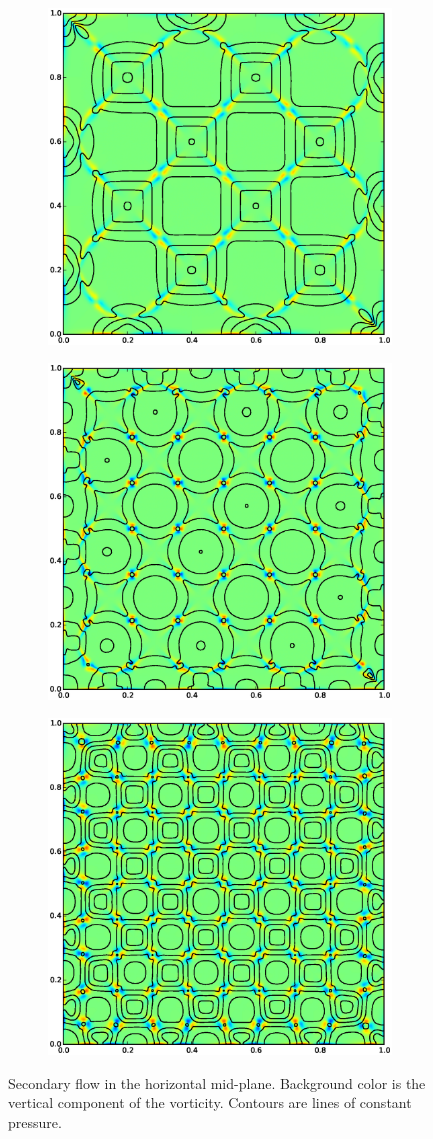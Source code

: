 \begin{figure}
\begin{subfigure}[b]{0.66\columnwidth}
  \includegraphics[width=0.66\columnwidth]{figs/vorticity-25-10}
\end{subfigure}
\begin{subfigure}[b]{0.66\columnwidth}
  \includegraphics[width=0.66\columnwidth]{figs/vorticity-35-10}
\end{subfigure}
\begin{subfigure}[b]{0.66\columnwidth}
  \includegraphics[width=0.66\columnwidth]{figs/vorticity-45-10}
\end{subfigure}
\caption{ 
Secondary flow in the horizontal mid-plane.
Background color is the vertical component of the vorticity.
Contours are lines of constant pressure.
}
\end{figure}

